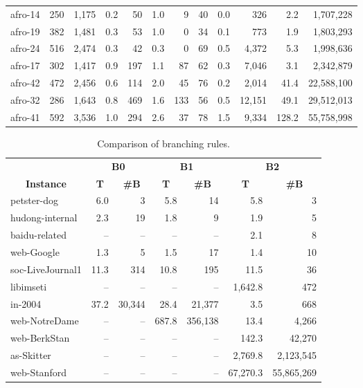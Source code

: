 \documentclass[11pt]{article}
\begin{document}
{\begin{table}[p!]
\begin{tabular*}{\columnwidth}{@{\extracolsep{\fill}}lrr|rr|rrr|rr|rr}
afro-14 & 250 & 1,175 & 0.2 & 50 & 1.0 & 9 & 40 & 0.0 & 326 & 2.2 & 1,707,228 \\
afro-19 & 382 & 1,481 & 0.3 & 53 & 1.0 & 0 & 34 & 0.1 & 773 & 1.9 & 1,803,293 \\
afro-24 & 516 & 2,474 & 0.3 & 42 & 0.3 & 0 & 69 & 0.5 & 4,372 & 5.3 & 1,998,636 \\
afro-17 & 302 & 1,417 & 0.9 & 197 & 1.1 & 87 & 62 & 0.3 & 7,046 & 3.1 & 2,342,879 \\
afro-42 & 472 & 2,456 & 0.6 & 114 & 2.0 & 45 & 76 & 0.2 & 2,014 & 41.4 & 22,588,100 \\
afro-32 & 286 & 1,643 & 0.8 & 469 & 1.6 & 133 & 56 & 0.5 & 12,151 & 49.1 & 29,512,013 \\
afro-41 & 592 & 3,536 & 1.0 & 294 & 2.6 & 37 & 78 & 1.5 & 9,334 & 128.2 & 55,758,998 \\
\bottomrule
\end{tabular*}
\end{table}
}
 
{
\begin{table}[p!]
\center
\caption{Comparison of branching rules.}
\label{tbl:branching_rule}
\fontsize{8pt}{0pt}\selectfont
\begin{tabular*}{\columnwidth}{@{\extracolsep{\fill}}l|rr|rr|rr}
\toprule
& \multicolumn{2}{c|}{\textbf{B0}}
& \multicolumn{2}{c|}{\textbf{B1}}
& \multicolumn{2}{c}{\textbf{B2}} \\
\multicolumn{1}{c|}{\textbf{Instance}} &
\multicolumn{1}{c}{\textbf{T}} & \multicolumn{1}{c|}{\textbf{\#B}} &
\multicolumn{1}{c}{\textbf{T}} & \multicolumn{1}{c|}{\textbf{\#B}} &
\multicolumn{1}{c}{\textbf{T}} & \multicolumn{1}{c}{\textbf{\#B}} \\
\midrule
petster-dog & 6.0 & 3 & 5.8 & 14 & 5.8 & 3 \\
hudong-internal & 2.3 & 19 & 1.8 & 9 & 1.9 & 5 \\
baidu-related & -- & -- & -- & -- & 2.1 & 8 \\
web-Google & 1.3 & 5 & 1.5 & 17 & 1.4 & 10 \\
soc-LiveJournal1 & 11.3 & 314 & 10.8 & 195 & 11.5 & 36 \\
libimseti & -- & -- & -- & -- & 1,642.8 & 472 \\
in-2004 & 37.2 & 30,344 & 28.4 & 21,377 & 3.5 & 668 \\
web-NotreDame & -- & -- & 687.8 & 356,138 & 13.4 & 4,266 \\
web-BerkStan & -- & -- & -- & -- & 142.3 & 42,270 \\
as-Skitter & -- & -- & -- & -- & 2,769.8 & 2,123,545 \\
web-Stanford & -- & -- & -- & -- & 67,270.3 & 55,865,269 \\
\bottomrule
\end{tabular*}
\end{table}
}
\end{document}
